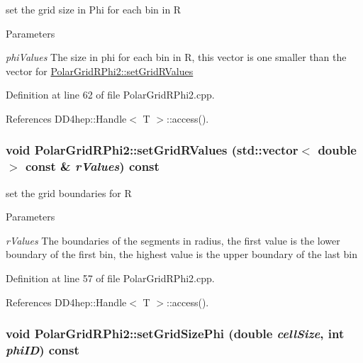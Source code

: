 set the grid size in Phi for each bin in R 
\begin{DoxyParams}{Parameters}
\item[{\em phiValues}]The size in phi for each bin in R, this vector is one smaller than the vector for \hyperlink{class_d_d4hep_1_1_geometry_1_1_polar_grid_r_phi2_a7ff94cffa0e209917f736acdf165d92f}{PolarGridRPhi2::setGridRValues} \end{DoxyParams}


Definition at line 62 of file PolarGridRPhi2.cpp.

References DD4hep::Handle$<$ T $>$::access().\hypertarget{class_d_d4hep_1_1_geometry_1_1_polar_grid_r_phi2_a7ff94cffa0e209917f736acdf165d92f}{
\subsubsection[{setGridRValues}]{\setlength{\rightskip}{0pt plus 5cm}void PolarGridRPhi2::setGridRValues (std::vector$<$ double $>$ const \& {\em rValues}) const}}
\label{class_d_d4hep_1_1_geometry_1_1_polar_grid_r_phi2_a7ff94cffa0e209917f736acdf165d92f}


set the grid boundaries for R 
\begin{DoxyParams}{Parameters}
\item[{\em rValues}]The boundaries of the segments in radius, the first value is the lower boundary of the first bin, the highest value is the upper boundary of the last bin \end{DoxyParams}


Definition at line 57 of file PolarGridRPhi2.cpp.

References DD4hep::Handle$<$ T $>$::access().\hypertarget{class_d_d4hep_1_1_geometry_1_1_polar_grid_r_phi2_ada61afd30d69f07143282e934cecbc1e}{
\subsubsection[{setGridSizePhi}]{\setlength{\rightskip}{0pt plus 5cm}void PolarGridRPhi2::setGridSizePhi (double {\em cellSize}, \/  int {\em phiID}) const}}
\label{class_d_d4hep_1_1_geometry_1_1_polar_grid_r_phi2_ada61afd30d69f07143282e934cecbc1e}


